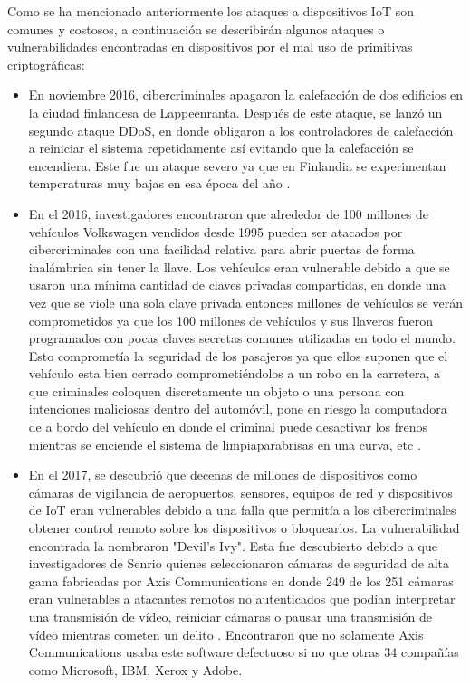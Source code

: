 \documentclass{article}
\begin{document}
            Como se ha mencionado anteriormente los ataques a dispositivos IoT son comunes y costosos, a continuación se describirán algunos ataques o vulnerabilidades encontradas en dispositivos por el mal uso de primitivas criptográficas:

            \begin{itemize}
                \item En noviembre 2016, cibercriminales apagaron la calefacción de dos edificios en la ciudad finlandesa de Lappeenranta. Después de este ataque, se lanzó un segundo ataque DDoS, en donde obligaron a los controladores de calefacción a reiniciar el sistema repetidamente así evitando que la calefacción se encendiera. Este fue un ataque severo ya que en Finlandia se experimentan temperaturas muy bajas en esa época del año \cite{husar_2022}.
                \item En el 2016, investigadores encontraron que alrededor de 100 millones de vehículos Volkswagen vendidos desde 1995 pueden ser atacados por cibercriminales con una facilidad relativa para abrir puertas de forma inalámbrica sin tener la llave. Los vehículos eran vulnerable debido a que se usaron una mínima cantidad de claves privadas compartidas, en donde una vez que se viole una sola clave privada entonces millones de vehículos se verán comprometidos ya que los 100 millones de vehículos y sus llaveros fueron programados con pocas claves secretas comunes utilizadas en todo el mundo. Esto comprometía la seguridad de los pasajeros ya que ellos suponen que el vehículo esta bien cerrado comprometiéndolos a un robo en la carretera, a que criminales coloquen discretamente un objeto o una persona con intenciones maliciosas dentro del automóvil, pone en riesgo la computadora de a bordo del vehículo en donde el criminal puede  desactivar los frenos mientras se enciende el sistema de limpiaparabrisas en una curva, etc  \cite{garcia_oswald_kasper_pavlides}.
                \item En el 2017, se descubrió que decenas de millones de dispositivos como cámaras de vigilancia de aeropuertos, sensores, equipos de red y dispositivos de IoT eran vulnerables debido a una falla que permitía a los cibercriminales obtener control remoto sobre los dispositivos o bloquearlos. La vulnerabilidad encontrada la nombraron "Devil's Ivy". Esta fue descubierto debido a que investigadores de Senrio quienes seleccionaron cámaras de seguridad de alta gama fabricadas por Axis Communications en donde 249 de los 251 cámaras eran vulnerables a atacantes remotos no autenticados que podían interpretar una transmisión de vídeo, reiniciar cámaras o pausar una transmisión de vídeo mientras cometen un delito \cite{spring_2019}. Encontraron que no solamente Axis Communications usaba este software defectuoso si no que otras 34 compañías como Microsoft, IBM, Xerox y Adobe.
            \end{itemize}
\end{document}
